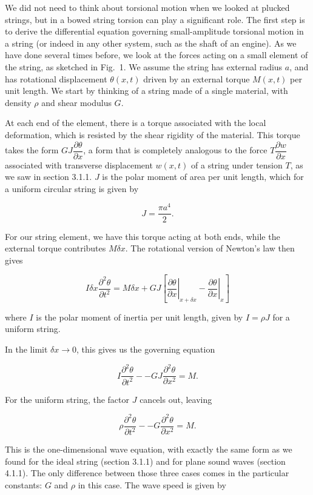   We did not need to think about torsional motion when we looked at plucked 
  strings, but in a bowed string torsion can play a significant role. The first 
  step is to derive the differential equation governing small-amplitude 
  torsional motion in a string (or indeed in any other system, such as the 
  shaft of an engine). As we have done several times before, we look at the 
  forces acting on a small element of the string, as sketched in Fig.\ 1. We 
  assume the string has external radius $a$, and has rotational displacement 
  $\theta(x,t)$ driven by an external torque $M(x,t)$ per unit length. We start 
  by thinking of a string made of a single material, with density $\rho$ and 
  shear modulus $G$. 

  At each end of the element, there is a torque associated with the local 
  deformation, which is resisted by the shear rigidity of the material. This 
  torque takes the form $GJ \dfrac{\partial \theta}{\partial x}$, a form that 
  is completely analogous to the force $T \dfrac{\partial w}{\partial x}$ 
  associated with transverse displacement $w(x,t)$ of a string under tension 
  $T$, as we saw in section 3.1.1. $J$ is the polar moment of area per unit 
  length, which for a uniform circular string is given by 

  $$J=\dfrac{\pi a^4}{2} . \tag{1}$$ 

  For our string element, we have this torque acting at both ends, while the 
  external torque contributes $M \delta x$. The rotational version of Newton's 
  law then gives 

  $$I \delta x \dfrac{\partial^2 \theta}{\partial t^2} = M \delta x +GJ\left[ 
  \left.\dfrac{\partial \theta}{\partial x} \right|_{x+ \delta x} 
  -\left.\dfrac{\partial \theta}{\partial x} \right|_{x} \right] \tag{2}$$ 

  where $I$ is the polar moment of inertia per unit length, given by $I=\rho J$ 
  for a uniform string. 

  In the limit $\delta x \rightarrow 0$, this gives us the governing equation 

  $$I \dfrac{\partial^2 \theta}{\partial t^2} -- GJ \dfrac{\partial^2 
  \theta}{\partial x^2}= M . \tag{3}$$ 

  For the uniform string, the factor $J$ cancels out, leaving 

  $$\rho \dfrac{\partial^2 \theta}{\partial t^2} -- G \dfrac{\partial^2 
  \theta}{\partial x^2}= M . \tag{4}$$ 

  This is the one-dimensional wave equation, with exactly the same form as we 
  found for the ideal string (section 3.1.1) and for plane sound waves (section 
  4.1.1). The only difference between those three cases comes in the particular 
  constants: $G$ and $\rho$ in this case. The wave speed is given by 

